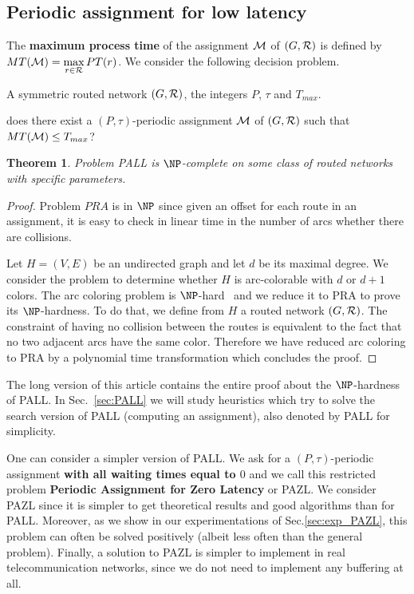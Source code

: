 \documentclass[10pt, conference, letterpaper]{IEEEtran}
\newtheorem{theorem}{Theorem}
\begin{document}
      
      \subsection{Periodic assignment for low latency}
      
      
    The {\bf maximum process time} of the assignment ${\cal M}$ of $(G,{\cal R})$ is defined by $MT({\cal M})=\max\limits_{r \in {\cal R}} PT(r)$. We consider the following decision problem.


        A symmetric routed network $(G,{\cal R})$, the integers $P$, $\tau$ and $T_{max}$.

       does there exist a $(P,\tau)$-periodic assignment ${\cal M}$ of $(G,{\cal R})$ such that $MT({\cal M}) \leq T_{max}$?

 \begin{theorem}
Problem PALL is $\NP$-complete on some class of routed networks with specific parameters.
\end{theorem}
 \begin{proof}
 Problem $PRA$ is in $\NP$ since given an offset for each route in an assignment, it is easy to check in linear time in the number of arcs whether there are collisions.
 
  Let $H=(V,E)$ be an undirected graph and let $d$ be its maximal degree. We consider the problem to determine whether $H$ is arc-colorable
  with $d$ or $d+1$ colors. The arc coloring problem is $\NP$-hard~\cite{holyer1981np} and we reduce it to PRA to prove its $\NP$-hardness. To do that, we define from $H$ a routed network $(G,{\cal R})$.  
 The constraint of having no collision between the routes is equivalent to the fact that no two adjacent arcs have the same color. Therefore we have reduced arc coloring to PRA by a polynomial time transformation which concludes the proof. 
 \end{proof}


     The long version of this article contains the entire proof about the $\NP$-hardness of PALL. 
      In Sec.~\ref{sec:PALL} we will study heuristics which try to solve the search version of PALL (computing an assignment), also denoted by PALL for simplicity.



One can consider a simpler version of PALL.
       We ask for a $(P,\tau)$-periodic assignment {\bf with all waiting times equal to $0$} and we call this restricted problem {\bf Periodic Assignment for Zero Latency} or PAZL. We consider PAZL since it is simpler to get theoretical results and good algorithms 
  than for PALL. Moreover, as we show in our experimentations of Sec.\ref{sec:exp_PAZL}, this problem can often be solved positively (albeit less often than the general problem). Finally, a solution to PAZL is simpler to implement in real telecommunication networks, since we do not need to implement any buffering at all.    
    
\end{document}
